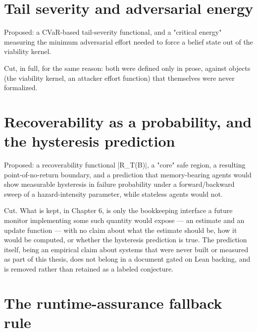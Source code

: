 \documentclass{memoir}
\begin{document}
\section{Tail severity and adversarial energy}\label{Capability--Monotonicity--in--a--Formal--Skeleton--for--Agentic--AI--Safety----What--Was--Cut-005F-005F-005F--and--Why----Tail--severity--and--adversarial--energy}

Proposed: a CVaR-based tail-severity functional, and a "critical energy"
measuring the minimum adversarial effort needed to force a belief state out
of the viability kernel.

Cut, in full, for the same reason: both were defined only in prose, against
objects (the viability kernel, an attacker effort function) that themselves
were never formalized.



\section{Recoverability as a probability, and the hysteresis prediction}\label{Capability--Monotonicity--in--a--Formal--Skeleton--for--Agentic--AI--Safety----What--Was--Cut-005F-005F-005F--and--Why----Recoverability--as--a--probability-005F-005F-005F--and--the--hysteresis--prediction}

Proposed: a recoverability functional \LeanVerb|R_T(B)|, a "core" safe region, a
resulting point-of-no-return boundary, and a prediction that memory-bearing
agents would show measurable hysteresis in failure probability under a
forward/backward sweep of a hazard-intensity parameter, while stateless
agents would not.

Cut. What is kept, in Chapter 6, is only the bookkeeping interface a future
monitor implementing some such quantity would expose — an estimate and an
update function — with no claim about what the estimate should be, how it
would be computed, or whether the hysteresis prediction is true. The
prediction itself, being an empirical claim about systems that were never
built or measured as part of this thesis, does not belong in a document
gated on Lean backing, and is removed rather than retained as a labeled
conjecture.



\section{The runtime-assurance fallback rule}\label{Capability--Monotonicity--in--a--Formal--Skeleton--for--Agentic--AI--Safety----What--Was--Cut-005F-005F-005F--and--Why----The--runtime--assurance--fallback--rule}
\end{document}
